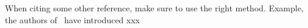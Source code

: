 When citing some other reference, make sure to use the right method. Example, the authors of~\cite{hybridcache20tirupathi} have introduced xxx


